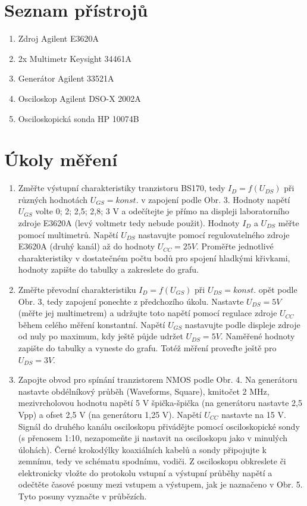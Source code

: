 \documentclass[a4paper, czech]{article}
\begin{document}
\section{Seznam přístrojů}

\begin{enumerate}
    \item Zdroj Agilent E3620A
    \item 2x Multimetr Keysight 34461A
    \item Generátor Agilent 33521A
    \item Osciloskop Agilent DSO-X 2002A
    \item Osciloskopická sonda HP 10074B
\end{enumerate}

\section{Úkoly měření}

\begin{enumerate}
    \item Změřte výstupní charakteristiky tranzistoru BS170, tedy $I_D = f (U_{DS})$ při různých hodnotách $U_{GS} = konst.$ v zapojení podle Obr. 3. Hodnoty napětí $U_{GS}$ volte 0; 2; 2,5; 2,8; 3 V a odečítejte je přímo na displeji laboratorního zdroje E3620A (levý voltmetr tedy nebude použit). Hodnoty $I_D$ a $U_{DS}$ měřte pomocí multimetrů. Napětí $U_{DS}$ nastavujte pomocí regulovatelného zdroje E3620A (druhý kanál) až do hodnoty $U_{CC} = 25 V$. Proměřte jednotlivé charakteristiky v dostatečném počtu bodů pro spojení hladkými křivkami, hodnoty zapište do tabulky a zakreslete do grafu.
    \item Změřte převodní charakteristiku $I_D = f (U_{GS})$ při $U_{DS} = konst.$ opět podle Obr. 3, tedy zapojení ponechte z předchozího úkolu. Nastavte $U_{DS} = 5 V$ (měřte jej multimetrem) a udržujte toto napětí pomocí regulace zdroje $U_{CC}$ během celého měření konstantní. Napětí $U_{GS}$ nastavujte podle displeje zdroje od nuly po maximum, kdy ještě půjde udržet $U_{DS} = 5 V$. Naměřené hodnoty zapište do tabulky a vyneste do grafu. Totéž měření proveďte ještě pro $U_{DS} = 3 V$. 
    \item Zapojte obvod pro spínání tranzistorem NMOS podle Obr. 4. Na generátoru nastavte obdélníkový průběh (Waveforms, Square), kmitočet 2 MHz, mezivrcholovou hodnotu napětí 5 V špička-špička (na generátoru nastavte 2,5 Vpp)  a ofset 2,5 V (na generátoru 1,25 V). Napětí $U_{CC}$ nastavte na 15 V. Signál do druhého kanálu osciloskopu přivádějte pomocí osciloskopické sondy (s přenosem 1:10, nezapomeňte ji nastavit na osciloskopu jako v minulých úlohách). Černé krokodýlky koaxiálních kabelů a sondy připojujte k zemnímu, tedy ve schématu spodnímu, vodiči. Z osciloskopu obkreslete či elektronicky vložte do protokolu vstupní a výstupní průběhy napětí a odečtěte časové posuny mezi vstupem a výstupem, jak je naznačeno v Obr. 5. Tyto posuny vyznačte v průbězích.
\end{enumerate}
\end{document}
